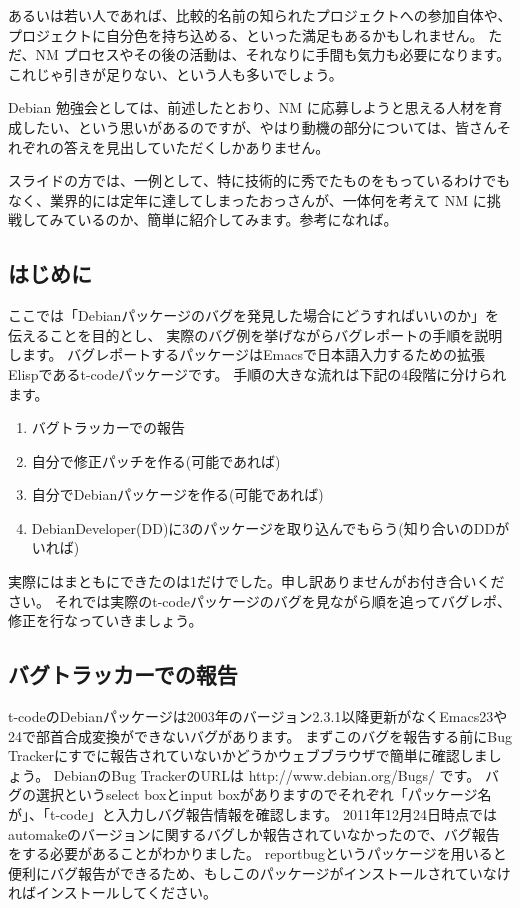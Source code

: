 \documentclass[mingoth,a4paper]{jsarticle}
\begin{document}
あるいは若い人であれば、比較的名前の知られたプロジェクトへの参加自体や、プロジェクトに自分色を持ち込める、といった満足もあるかもしれません。
ただ、NM プロセスやその後の活動は、それなりに手間も気力も必要になります。これじゃ引きが足りない、という人も多いでしょう。

Debian 勉強会としては、前述したとおり、NM に応募しようと思える人材を育成したい、という思いがあるのですが、やはり動機の部分については、皆さんそれぞれの答えを見出していただくしかありません。

スライドの方では、一例として、特に技術的に秀でたものをもっているわけでもなく、業界的には定年に達してしまったおっさんが、一体何を考えて NM に挑戦してみているのか、簡単に紹介してみます。参考になれば。

\clearpage
{}

\subsection{はじめに}

ここでは「Debianパッケージのバグを発見した場合にどうすればいいのか」を伝えることを目的とし、
実際のバグ例を挙げながらバグレポートの手順を説明します。
バグレポートするパッケージはEmacsで日本語入力するための拡張Elispであるt-codeパッケージです。
手順の大きな流れは下記の4段階に分けられます。

\begin{enumerate}
  \item バグトラッカーでの報告
  \item 自分で修正パッチを作る(可能であれば)
  \item 自分でDebianパッケージを作る(可能であれば)
  \item DebianDeveloper(DD)に3のパッケージを取り込んでもらう(知り合いのDDがいれば)
\end{enumerate}

実際にはまともにできたのは1だけでした。申し訳ありませんがお付き合いください。
それでは実際のt-codeパッケージのバグを見ながら順を追ってバグレポ、修正を行なっていきましょう。

\subsection{バグトラッカーでの報告}

t-codeのDebianパッケージは2003年のバージョン2.3.1以降更新がなくEmacs23や24で部首合成変換ができないバグがあります。
まずこのバグを報告する前にBug Trackerにすでに報告されていないかどうかウェブブラウザで簡単に確認しましょう。
DebianのBug TrackerのURLは http://www.debian.org/Bugs/ です。
バグの選択というselect boxとinput boxがありますのでそれぞれ「パッケージ名が」、「t-code」と入力しバグ報告情報を確認します。
2011年12月24日時点ではautomakeのバージョンに関するバグしか報告されていなかったので、バグ報告をする必要があることがわかりました。
reportbugというパッケージを用いると便利にバグ報告ができるため、もしこのパッケージがインストールされていなければインストールしてください。
\end{document}
